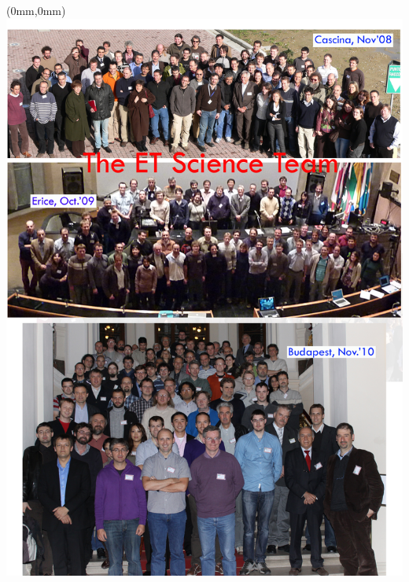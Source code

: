 \documentclass[draft,color,DIV12,pdftex,a4paper]{ET-DS}
\begin{document}
\clearpage
\listoffigures
\clearpage
\listoftables
\clearpage
{}
\newpage

\printnomenclature[0.75in] 
\newpage

\newpage 
%
\FloatBarrier
%
%
\pagestyle{empty}
\begin{textblock*}{297mm}(0mm,0mm)   \includegraphics[width=\paperwidth]{TheETscienceTeam.jpg}
\end{textblock*}
\newpage
\end{document}
